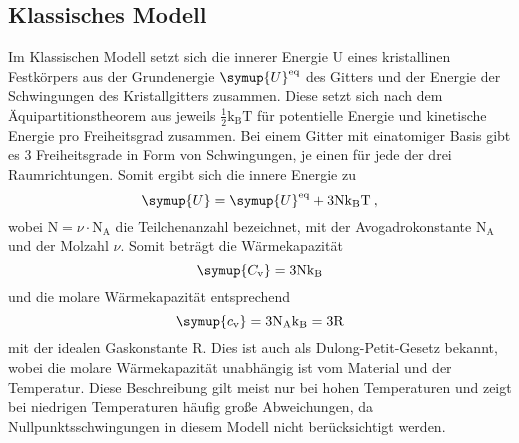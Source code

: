 \subsection{Klassisches Modell}
Im Klassischen Modell setzt sich die innerer Energie U eines kristallinen Festkörpers
aus der Grundenergie $\symup{U}^{\text{eq}}$ des Gitters und der Energie der Schwingungen
des Kristallgitters zusammen.
Diese setzt sich nach dem Äquipartitionstheorem aus jeweils $\frac{1}{2}\text{k}_{\text{B}}\text{T}$
für potentielle Energie und kinetische Energie pro Freiheitsgrad zusammen. Bei einem Gitter
mit einatomiger Basis gibt es 3 Freiheitsgrade in Form von Schwingungen, je einen für jede der
drei Raumrichtungen.
Somit ergibt sich die innere Energie zu
\begin{equation}
  \symup{U} = \symup{U}^{\text{eq}} + 3\text{N}\text{k}_{\text{B}}\text{T} \: ,
  \label{eqn:Uklassisch}
\end{equation}
wobei $\text{N}=\nu \cdot \text{N}_{\text{A}}$ die Teilchenanzahl bezeichnet, mit der
Avogadrokonstante $\text{N}_{\text{A}}$ und der Molzahl $\nu$.
Somit beträgt die Wärmekapazität
\begin{equation}
  \symup{C_{\text{v}}} = 3\text{N}\text{k}_{\text{B}}
  \label{eqn:Cklassich}
\end{equation}
und die molare Wärmekapazität entsprechend
\begin{equation}
  \symup{c_{\text{v}}} = 3\text{N}_{\text{A}}\text{k}_{\text{B}} = 3\text{R}
  \label{eqn:Cklassich}
\end{equation}
mit der idealen Gaskonstante R. Dies ist auch als Dulong-Petit-Gesetz bekannt, wobei
die molare Wärmekapazität unabhängig ist vom Material und der Temperatur.
Diese Beschreibung gilt meist nur bei hohen Temperaturen und zeigt bei niedrigen
Temperaturen häufig große Abweichungen, da Nullpunktsschwingungen in diesem Modell
nicht berücksichtigt werden.

